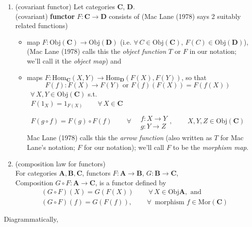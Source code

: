 \begin{definition}\label{agat:Def:Functor}
\begin{enumerate}
	\item (covariant functor) Let categories $\mathbf{C}$, $\mathbf{D}$. \\
(covariant) \textbf{functor} $F: \mathbf{C} \to \mathbf{D}$ consists of (Mac Lane (1978) \cite{agat:MacL1978} says 2 suitably related functions)
\begin{itemize}
	\item map $F: \text{Obj}(\mathbf{C}) \to \text{Obj}(\mathbf{D})$ (i.e. $\forall \, C \in \text{Obj}(\mathbf{C})$, $F(C) \in \text{Obj}(\mathbf{D})$), \\
	(Mac Lane (1978) \cite{agat:MacL1978} calls this the \emph{object function} $T$ or $F$ in our notation; we'll call it the \emph{object map}) and 
	\item maps $F: \text{Hom}_{\mathbf{C}}(X,Y) \to \text{Hom}_{\mathbf{D}}(F(X), F(Y))$, so that 
		\[	
			F(f) : F(X) \to F(Y) \text{ or } F(f)(F(X)) = F(f(X)) 
		\] \, $\forall \, X,Y \in \text{Obj}(\mathbf{C})$ s.t.
	\begin{equation}
	\begin{gathered}
	F(1_X) = 1_{F(X)} \qquad \, \forall \, X \in \mathbf{C} \\
	F(g\circ f) = F(g) \circ F(f) \qquad \, \forall \, \begin{aligned} & \quad \\ 
	& f: X \to Y \\
	& g: Y \to Z \end{aligned}, \qquad \, X,Y,Z \in \text{Obj}(\mathbf{C})
	\end{gathered}
	\end{equation}
	Mac Lane (1978) \cite{agat:MacL1978} calls this the \emph{arrow function} (also written as $T$ for Mac Lane's notation; $F$ for our notation); we'll call $F$ to be the \emph{morphism map}. 
\end{itemize}
\item (composition law for functors) \\
For categories $\mathbf{A} , \mathbf{B}, \mathbf{C}$, functors $F: \mathbf{A} \to \mathbf{B}$, $G: \mathbf{B} \to \mathbf{C}$, \\
Composition $G\circ F : \mathbf{A} \to \mathbf{C}$, is a functor defined by 
\begin{equation}
\begin{aligned}
& (G\circ F)(X) = G(F(X)) \qquad \, \forall \, X \in \text{Obj}\mathbf{A}, \text{ and } \\
& (G\circ F)(f) = G(F(f)), \qquad \, \forall \, \text{ morphism } f \in \text{Mor}(\mathbf{C})
\end{aligned}
\end{equation}
\end{enumerate}
\end{definition}
Diagrammatically,


